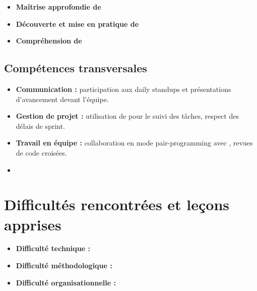 \begin{itemize}
  \item \textbf{Maîtrise approfondie de} 
  \item \textbf{Découverte et mise en pratique de} 
  \item \textbf{Compréhension de} 
\end{itemize}

\subsection{Compétences transversales}


\begin{itemize}
  \item \textbf{Communication :} participation aux daily standups et
        présentations d'avancement devant l'équipe.
  \item \textbf{Gestion de projet :} utilisation de 
        pour le suivi des tâches, respect des délais de sprint.
  \item \textbf{Travail en équipe :} collaboration en mode pair-programming
        avec , revues de code croisées.
  \item {}
\end{itemize}

\section{Difficultés rencontrées et leçons apprises}
\label{sec:ccl:difficultes}


\begin{itemize}
  \item \textbf{Difficulté technique :} 
  \item \textbf{Difficulté méthodologique :} 
  \item \textbf{Difficulté organisationnelle :} 
\end{itemize}

